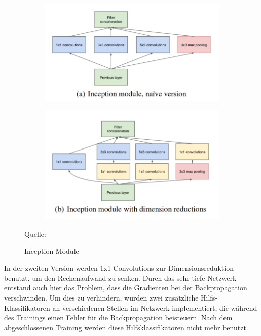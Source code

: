\documentclass[11pt,a4paper]{article}
\newcommand{\source}[1]{\caption*{\hfill Quelle: {#1}} }
\numberwithin{equation}{section}
\begin{document}
	
	
	\begin{figure}
		\centering
		\begin{subfigure}{.5\textwidth}
			\centering
				\includegraphics[width=.7\linewidth]{inception_module_naive.png}
			
		\end{subfigure}%
		\begin{subfigure}{.5\textwidth}
			\centering
			\includegraphics[width=.7\linewidth]{inception_module_advanced.png}
			
		\end{subfigure}
		\caption{Inception-Module}
		\source{\cite{goingdeeperwithconvolutions}}
		
		\label{inception_modules}
	\end{figure}


	In der zweiten Version werden 1x1 Convolutions zur Dimensionsreduktion benutzt, um den Rechenaufwand zu senken.
	Durch das sehr tiefe Netzwerk entstand auch hier das Problem, dass die Gradienten bei der Backpropagation verschwinden. Um dies zu verhindern, wurden zwei zusätzliche Hilfs-Klassifikatoren an verschiedenen Stellen im Netzwerk implementiert, die während des Trainings einen Fehler für die Backpropagation beisteuern. Nach dem abgeschlossenen Training werden diese Hilfsklassifikatoren nicht mehr benutzt.
	
\end{document}
